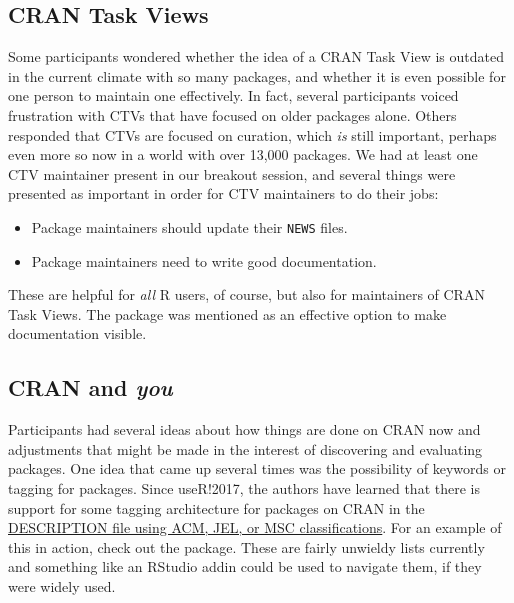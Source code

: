 \hypertarget{cran-task-views}{%
\subsection{CRAN Task Views}\label{cran-task-views}}

Some participants wondered whether the idea of a CRAN Task View
\citep{ctvs} is outdated in the current climate with so many packages,
and whether it is even possible for one person to maintain one
effectively. In fact, several participants voiced frustration with CTVs
that have focused on older packages alone. Others responded that CTVs
are focused on curation, which \emph{is} still important, perhaps even
more so now in a world with over 13,000 packages. We had at least one
CTV maintainer present in our breakout session, and several things were
presented as important in order for CTV maintainers to do their jobs:

\begin{itemize}
\tightlist
\item
  Package maintainers should update their \texttt{NEWS} files.
\item
  Package maintainers need to write good documentation.
\end{itemize}

These are helpful for \emph{all} R users, of course, but also for
maintainers of CRAN Task Views. The  \citep{pkgdown}
package was mentioned as an effective option to make documentation
visible.

\hypertarget{cran-and-you}{%
\subsection{\texorpdfstring{CRAN and
\emph{you}}{CRAN and you}}\label{cran-and-you}}

Participants had several ideas about how things are done on CRAN now and
adjustments that might be made in the interest of discovering and
evaluating packages. One idea that came up several times was the
possibility of keywords or tagging for packages. Since useR!2017, the
authors have learned that there is support for some tagging architecture
for packages on CRAN in the
\href{https://cran.r-project.org/doc/manuals/r-release/R-exts.html\#The-DESCRIPTION-file}{DESCRIPTION
file using ACM, JEL, or MSC classifications}. For an example of this in
action, check out the  \citep{lfe} package. These are
fairly unwieldy lists currently and something like an RStudio addin
could be used to navigate them, if they were widely used.

